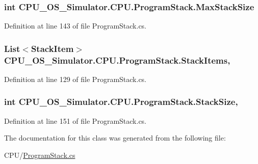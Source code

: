 \subsubsection[{Max\+Stack\+Size}]{\setlength{\rightskip}{0pt plus 5cm}int C\+P\+U\+\_\+\+O\+S\+\_\+\+Simulator.\+C\+P\+U.\+Program\+Stack.\+Max\+Stack\+Size\hspace{0.3cm}{\ttfamily [get]}}\label{class_c_p_u___o_s___simulator_1_1_c_p_u_1_1_program_stack_a5ed770e83658cfcde6e451c27342dca3}


Definition at line 143 of file Program\+Stack.\+cs.

\hypertarget{class_c_p_u___o_s___simulator_1_1_c_p_u_1_1_program_stack_a13eb0a485bbcdba8a38bbf80e78692c7}{}
\subsubsection[{Stack\+Items}]{\setlength{\rightskip}{0pt plus 5cm}List$<${\bf Stack\+Item}$>$ C\+P\+U\+\_\+\+O\+S\+\_\+\+Simulator.\+C\+P\+U.\+Program\+Stack.\+Stack\+Items\hspace{0.3cm}{\ttfamily [get]}, {\ttfamily [set]}}\label{class_c_p_u___o_s___simulator_1_1_c_p_u_1_1_program_stack_a13eb0a485bbcdba8a38bbf80e78692c7}


Definition at line 129 of file Program\+Stack.\+cs.

\hypertarget{class_c_p_u___o_s___simulator_1_1_c_p_u_1_1_program_stack_ac9cedcbfdf26ffa757042280f21da367}{}
\subsubsection[{Stack\+Size}]{\setlength{\rightskip}{0pt plus 5cm}int C\+P\+U\+\_\+\+O\+S\+\_\+\+Simulator.\+C\+P\+U.\+Program\+Stack.\+Stack\+Size\hspace{0.3cm}{\ttfamily [get]}, {\ttfamily [set]}}\label{class_c_p_u___o_s___simulator_1_1_c_p_u_1_1_program_stack_ac9cedcbfdf26ffa757042280f21da367}


Definition at line 151 of file Program\+Stack.\+cs.



The documentation for this class was generated from the following file\+:\begin{DoxyCompactItemize}
\item 
C\+P\+U/\hyperlink{_program_stack_8cs}{Program\+Stack.\+cs}\end{DoxyCompactItemize}
